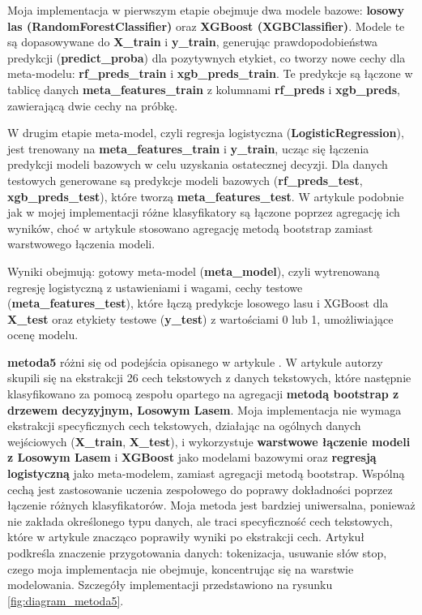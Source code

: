 Moja implementacja w pierwszym etapie obejmuje dwa modele bazowe: \textbf{losowy las (RandomForestClassifier)} oraz \textbf{XGBoost (XGBClassifier)}. Modele te są dopasowywane do \textbf{X\_train} i \textbf{y\_train}, generując prawdopodobieństwa predykcji (\textbf{predict\_proba}) dla pozytywnych etykiet, co tworzy nowe cechy dla meta-modelu: \newline\textbf{rf\_preds\_train} i \textbf{xgb\_preds\_train}. Te predykcje są łączone w tablicę danych \newline\textbf{meta\_features\_train} z kolumnami \textbf{rf\_preds} i \textbf{xgb\_preds}, zawierającą dwie cechy na próbkę.

W drugim etapie meta-model, czyli regresja logistyczna (\textbf{LogisticRegression}), jest trenowany na \textbf{meta\_features\_train} i \textbf{y\_train}, ucząc się łączenia predykcji modeli bazowych w celu uzyskania ostatecznej decyzji. Dla danych testowych generowane są predykcje modeli bazowych (\textbf{rf\_preds\_test}, \textbf{xgb\_preds\_test}), które tworzą \textbf{meta\_features\_test}. W artykule \cite{metoda5} podobnie jak w mojej implementacji różne klasyfikatory są łączone poprzez agregację ich wyników, choć w artykule stosowano agregację metodą bootstrap zamiast warstwowego łączenia modeli.

Wyniki obejmują: gotowy meta-model (\textbf{meta\_model}), czyli wytrenowaną regresję logistyczną z ustawieniami i wagami, cechy testowe \newline(\textbf{meta\_features\_test}), które łączą predykcje losowego lasu i XGBoost dla \textbf{X\_test} oraz etykiety testowe (\textbf{y\_test}) z wartościami 0 lub 1, umożliwiające ocenę modelu.

\textbf{metoda5} różni się od podejścia opisanego w artykule \cite{metoda5}. W artykule autorzy skupili się na ekstrakcji 26 cech tekstowych z danych tekstowych, które następnie klasyfikowano za pomocą zespołu opartego na agregacji \textbf{metodą bootstrap z drzewem decyzyjnym, Losowym Lasem}. Moja implementacja nie wymaga ekstrakcji specyficznych cech tekstowych, działając na ogólnych danych wejściowych (\textbf{X\_train}, \textbf{X\_test}), i wykorzystuje \textbf{warstwowe łączenie modeli z Losowym Lasem} i \textbf{XGBoost} jako modelami bazowymi oraz \textbf{regresją logistyczną} jako meta-modelem, zamiast agregacji metodą bootstrap. Wspólną cechą jest zastosowanie uczenia zespołowego do poprawy dokładności poprzez łączenie różnych klasyfikatorów. Moja metoda jest bardziej uniwersalna, ponieważ nie zakłada określonego typu danych, ale traci specyficzność cech tekstowych, które w artykule znacząco poprawiły wyniki po ekstrakcji cech. Artykuł podkreśla znaczenie przygotowania danych: tokenizacja, usuwanie słów stop, czego moja implementacja nie obejmuje, koncentrując się na warstwie modelowania. Szczegóły implementacji przedstawiono na rysunku \ref{fig:diagram_metoda5}.

